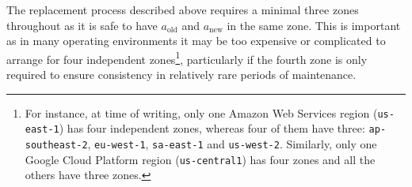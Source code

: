 \documentclass[journal]{IEEEtran}
\begin{document}
The replacement process described above requires a minimal three zones
throughout as it is safe to have $a_\mathrm{old}$ and $a_\mathrm{new}$ in the
same zone. This is important as in many operating environments it may be too
expensive or complicated to arrange for four independent zones\footnote{For
instance, at time of writing, only one Amazon Web Services region
(\texttt{us-east-1}) has four independent zones, whereas four of them have
three: \texttt{ap-southeast-2}, \texttt{eu-west-1}, \texttt{sa-east-1} and
\texttt{us-west-2}. Similarly, only one Google Cloud Platform region
(\texttt{us-central1}) has four zones and all the others have three zones.},
particularly if the fourth zone is only required to ensure consistency in
relatively rare periods of maintenance.



%
%

\end{document}

